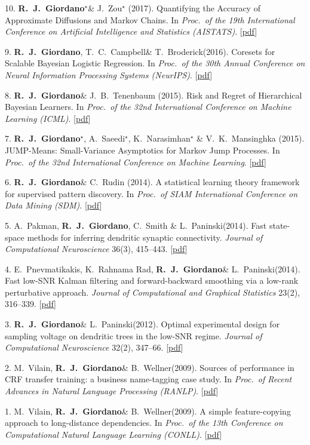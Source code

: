 \documentclass[margin,line]{res}
\newcommand{\me}{\textbf{R.~J.~Giordano}\xspace}
\newcommand{\mestar}{\textbf{R.~J.~Giordano}$^{\star}$\xspace}
\newcommand{\trevor}{T.~C.~Campbell\xspace}
\newcommand{\tamara}{T.~Broderick\xspace}
\newcommand{\liam}{L.~Paninski\xspace}
\newcommand{\vhw}{M.~Vilain, \me \& B.~Wellner\xspace}
\newcommand{\paperref}[1]{[\href{#1}{pdf}]}
\newcommand{\paperref}[1]{}
\begin{document}
\begin{resume}
10. \mestar \& J.~Zou$^{\star}$ (2017).
Quantifying the Accuracy of Approximate Diffusions and Markov Chains.
In \emph{Proc.~of the 19th International Conference on Artificial Intelligence and Statistics (AISTATS)}.
\paperref{http://arxiv.org/abs/1605.06420}

9. \me, \trevor \& \tamara (2016).
Coresets for Scalable Bayesian Logistic Regression.
In \emph{Proc.~of the 30th Annual Conference on Neural Information Processing Systems (NeurIPS)}.
\paperref{http://arxiv.org/abs/1605.06423}

8. \me \& J.~B.~Tenenbaum (2015).
Risk and Regret of Hierarchical Bayesian Learners.
In \emph{Proc.~of the 32nd International Conference on Machine Learning (ICML)}.
\paperref{http://arxiv.org/abs/1505.04984}

7. \mestar, A.~Saeedi$^{\star}$, K.~Narasimhan$^{\star}$ \& V.~K.~Mansinghka (2015).
JUMP-Means: Small-Variance Asymptotics for Markov Jump Processes.
In \emph{Proc.~of the 32nd International Conference on Machine Learning}.
\paperref{http://arxiv.org/abs/1503.00332}

6. \me \& C.~Rudin (2014).
A statistical learning theory framework for supervised pattern discovery.
In {\em Proc.~of SIAM International Conference on Data Mining (SDM)}.
\paperref{http://www.jhhuggins.org/papers/HuRu-SDM-2014.pdf}

5. A.~Pakman, \me, C.~Smith \& \liam (2014).
Fast state-space methods for inferring dendritic synaptic connectivity.
{\em Journal of Computational Neuroscience} 36(3), 415--443.
\paperref{http://www.jhhuggins.org/papers/PHSP-JCNS-2014.pdf}

4. E.~Pnevmatikakis, K.~Rahnama Rad, \me \& \liam (2014).
Fast low-SNR Kalman filtering and forward-backward smoothing via a low-rank perturbative approach.
{\em Journal of Computational and Graphical Statistics} 23(2), 316--339. \paperref{http://www.jhhuggins.org/papers/PRHP-JCGS-2013.pdf}

3. \me \& \liam (2012).
Optimal experimental design for sampling voltage on dendritic trees in the low-SNR regime.
{\em Journal of Computational Neuroscience} 32(2), 347--66.
\paperref{http://www.jhhuggins.org/papers/HuPa-JCNS-2012.pdf}

2. \vhw (2009).
Sources of performance in CRF transfer training: a business name-tagging case study.
In {\em Proc.~of Recent Advances in Natural Language Processing (RANLP)}.
\paperref{http://www.jhhuggins.org/papers/VHW-RANLP-2009.pdf}

1. \vhw (2009).
A simple feature-copying approach to long-distance dependencies.
In {\em Proc.~of the 13th Conference on Computational Natural Language Learning (CONLL)}.
\paperref{http://www.jhhuggins.org/papers/VHW-CONLL-2009.pdf}


\end{resume}
\end{document}
